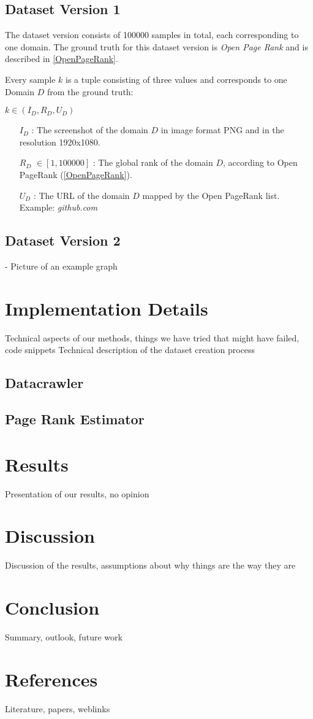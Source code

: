 \documentclass{article}
\begin{document}
\subsection{Dataset Version 1}
The dataset version consists of 100000 samples in total, each corresponding to one domain. The ground truth for this dataset version is \textit{Open Page Rank} and is described in \ref{OpenPageRank}.

Every sample $k$ is a tuple consisting of three values and corresponds to one Domain $D$ from the ground truth:

\begin{center}
 $ k \in (I_D, R_D, U_D)$
\begin{itemize}
	\item[$I_D$]: The screenshot of the domain $D$ in image format PNG and in the resolution 1920x1080.
	\item[$R_D$] $\in [1, 100000]$ : The global rank of the domain $D$, according to Open PageRank (\ref{OpenPageRank}). 
	\item[$U_D$]: The URL of the domain $D$ mapped by the Open PageRank list. Example: \textit{github.com}
\end{itemize}

\end{center}

\subsection{Dataset Version 2}
- Picture of an example graph

\section{Implementation Details}
Technical aspects of our methods, things we have tried that might have failed, code snippets
Technical description of the dataset creation process
\subsection{Datacrawler}
\subsection{Page Rank Estimator}
\section{Results}
Presentation of our results, no opinion

\section{Discussion}
Discussion of the results, assumptions about why things are the way they are

\section{Conclusion}
Summary, outlook, future work

\section{References}
Literature, papers, weblinks
\end{document}

